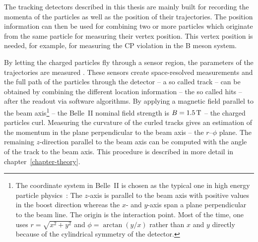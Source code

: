 The tracking detectors described in this thesis are mainly built for recording the momenta of the particles as well as the position of their trajectories. The position information can then be used for combining two or more particles which originate from the same particle for measuring their vertex position. This vertex position is needed, for example, for measuring the CP violation in the B meson system. %

By letting the charged particles fly through a sensor region, the parameters of the trajectories are measured . These sensors create space-resolved measurements and the full path of the particles through the detector -- a so called track -- can be obtained by combining the different location information -- the so called hits -- after the readout via software algorithms. By applying a magnetic field parallel to the beam axis\footnote{The coordinate system in Belle~II is chosen as the typical one in high energy particle physics~\cite{coordinate}: The $z$-axis is parallel to the beam axis with positive values in the boost direction whereas the $x$- and $y$-axis span a plane perpendicular to the beam line. The origin is the interaction point. Most of the time, one uses $r = \sqrt{x^2 + y^2}$ and $\phi = \arctan(y/x)$ rather than $x$ and $y$ directly because of the cylindrical symmetry of the detector.} -- the Belle~II nominal field strength is $B = \unit[1.5]{T}$ -- the charged particles curl. Measuring the curvature of the curled tracks gives an estimation of the momentum in the plane perpendicular to the beam axis -- the $r$--$\phi$ plane. The remaining $z$-direction parallel to the beam axis can be computed with the angle of the track to the beam axis. This procedure is described in more detail in chapter~\ref{chapter-theory}.

